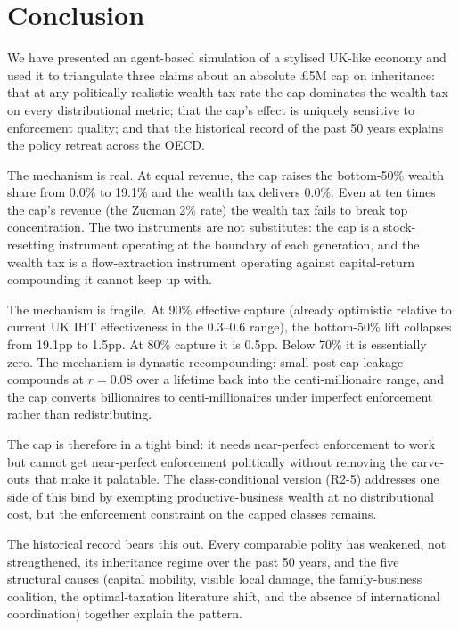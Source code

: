 \documentclass[11pt]{article}
\begin{document}
\section{Conclusion}

We have presented an agent-based simulation of a stylised UK-like
economy and used it to triangulate three claims about an absolute
\pounds 5M cap on inheritance: that at any politically realistic
wealth-tax rate the cap dominates the wealth tax on every
distributional metric; that the cap's effect is uniquely sensitive
to enforcement quality; and that the historical record of the
past 50 years explains the policy retreat across the OECD.

The mechanism is real.  At equal revenue, the cap raises the
bottom-50\% wealth share from 0.0\% to 19.1\% and the wealth tax
delivers 0.0\%.  Even at ten times the cap's revenue (the Zucman
2\% rate) the wealth tax fails to break top concentration.  The
two instruments are not substitutes: the cap is a stock-resetting
instrument operating at the boundary of each generation, and the
wealth tax is a flow-extraction instrument operating against
capital-return compounding it cannot keep up with.

The mechanism is fragile.  At 90\% effective capture (already
optimistic relative to current UK IHT effectiveness in the
0.3--0.6 range), the bottom-50\% lift collapses from 19.1pp to
1.5pp.  At 80\% capture it is 0.5pp.  Below 70\% it is
essentially zero.  The mechanism is dynastic recompounding:
small post-cap leakage compounds at $r=0.08$ over a lifetime back
into the centi-millionaire range, and the cap converts
billionaires to centi-millionaires under imperfect enforcement
rather than redistributing.

The cap is therefore in a tight bind: it needs near-perfect
enforcement to work but cannot get near-perfect enforcement
politically without removing the carve-outs that make it
palatable.  The class-conditional version (R2-5) addresses one
side of this bind by exempting productive-business wealth at no
distributional cost, but the enforcement constraint on the capped
classes remains.

The historical record bears this out.  Every comparable polity has
weakened, not strengthened, its inheritance regime over the past 50
years, and the five structural causes (capital mobility, visible
local damage, the family-business coalition, the optimal-taxation
literature shift, and the absence of international coordination)
together explain the pattern.
\end{document}
